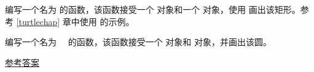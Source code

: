 \begin{exercise}


编写一个名为 {\em {}} 的函数，该函数接受一个 {\em {}} 对象和一个 {\em {}} 对象，使用 {\em {}} 画出该矩形。参考 \ref{turtlechap} 章中使用 {\em {}} 的示例。


编写一个名为　{\em {}} 的函数，该函数接受一个 {\em {}} 对象和 {\em {}} 对象，并画出该圆。


\href{http://thinkpython2.com/code/draw.py}{参考答案}

\end{exercise}